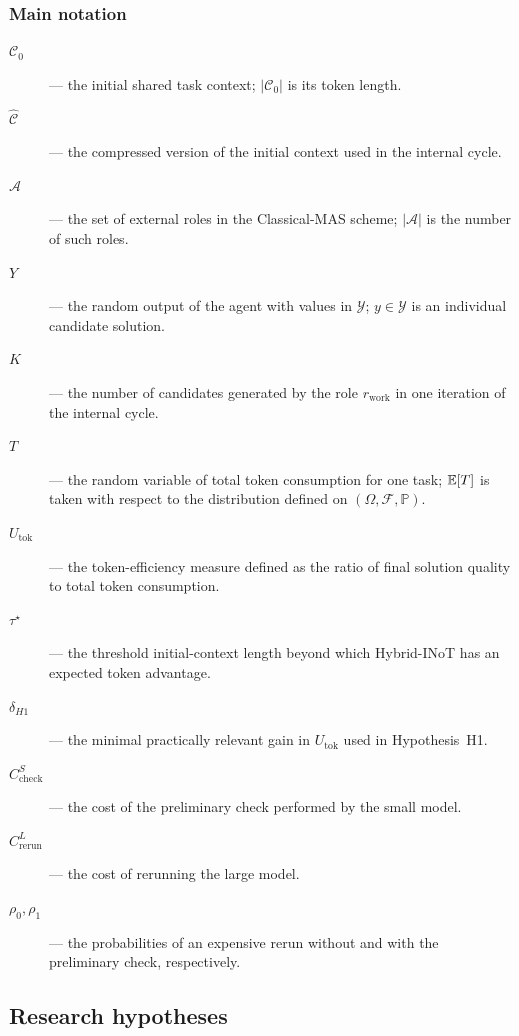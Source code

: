 \subsubsection*{Main notation}
\begin{description}
\item[$\mathcal{C}_0$] --- the initial shared task context; $|\mathcal{C}_0|$ is its token length.
\item[$\hat{\mathcal{C}}$] --- the compressed version of the initial context used in the internal cycle.
\item[$\mathcal{A}$] --- the set of external roles in the \textrm{Classical-MAS} scheme; $|\mathcal{A}|$ is the number of such roles.
\item[$Y$] --- the random output of the agent with values in $\mathcal{Y}$; $y\in\mathcal{Y}$ is an individual candidate solution.
\item[$K$] --- the number of candidates generated by the role $r_{\text{work}}$ in one iteration of the internal cycle.
\item[$T$] --- the random variable of total token consumption for one task; $\mathbb{E}[T]$ is taken with respect to the distribution defined on $(\Omega,\mathcal{F},\mathbb{P})$.
\item[$U_{\text{tok}}$] --- the token-efficiency measure defined as the ratio of final solution quality to total token consumption.
\item[$\tau^\star$] --- the threshold initial-context length beyond which \textrm{Hybrid-INoT} has an expected token advantage.
\item[$\delta_{H1}$] --- the minimal practically relevant gain in $U_{\text{tok}}$ used in Hypothesis~H1.
\item[$C_{\text{check}}^S$] --- the cost of the preliminary check performed by the small model.
\item[$C_{\text{rerun}}^L$] --- the cost of rerunning the large model.
\item[$\rho_0,\rho_1$] --- the probabilities of an expensive rerun without and with the preliminary check, respectively.
\end{description}

\subsection{Research hypotheses}

